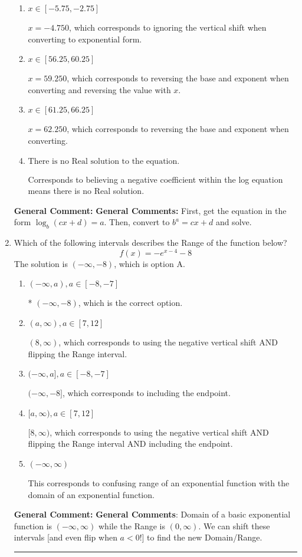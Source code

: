 \documentclass{extbook}[14pt]
\newcommand{\litem}[1]{\item #1

\rule{\textwidth}{0.4pt}}
\begin{document}
\begin{enumerate}
{\begin{enumerate}[label=\Alph*.]
* $x = 1.498$, which is the correct option.
\item \( x \in [-5.75, -2.75] \)

$x = -4.750$, which corresponds to ignoring the vertical shift when converting to exponential form.
\item \( x \in [56.25, 60.25] \)

$x = 59.250$, which corresponds to reversing the base and exponent when converting and reversing the value with $x$.
\item \( x \in [61.25, 66.25] \)

$x = 62.250$, which corresponds to reversing the base and exponent when converting.
\item \( \text{There is no Real solution to the equation.} \)

Corresponds to believing a negative coefficient within the log equation means there is no Real solution.
\end{enumerate}

\textbf{General Comment:} \textbf{General Comments:} First, get the equation in the form $\log_b{(cx+d)} = a$. Then, convert to $b^a = cx+d$ and solve.
}
\litem{
Which of the following intervals describes the Range of the function below?
\[ f(x) = -e^{x-4}-8 \]The solution is \( (-\infty, -8) \), which is option A.\begin{enumerate}[label=\Alph*.]
\item \( (-\infty, a), a \in [-8, -7] \)

* $(-\infty, -8)$, which is the correct option.
\item \( (a, \infty), a \in [7, 12] \)

$(8, \infty)$, which corresponds to using the negative vertical shift AND flipping the Range interval.
\item \( (-\infty, a], a \in [-8, -7] \)

$(-\infty, -8]$, which corresponds to including the endpoint.
\item \( [a, \infty), a \in [7, 12] \)

$[8, \infty)$, which corresponds to using the negative vertical shift AND flipping the Range interval AND including the endpoint.
\item \( (-\infty, \infty) \)

This corresponds to confusing range of an exponential function with the domain of an exponential function.
\end{enumerate}

\textbf{General Comment:} \textbf{General Comments}: Domain of a basic exponential function is $(-\infty, \infty)$ while the Range is $(0, \infty)$. We can shift these intervals [and even flip when $a<0$!] to find the new Domain/Range.
}
\end{enumerate}
\end{document}
